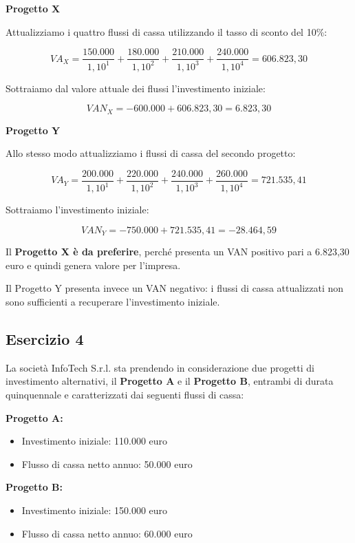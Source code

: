 \noindent\textbf{Progetto X}

\noindent Attualizziamo i quattro flussi di cassa utilizzando il tasso di sconto
del 10\%:

\[
VA_X=
\frac{150.000}{1,10^1}
+\frac{180.000}{1,10^2}
+\frac{210.000}{1,10^3}
+\frac{240.000}{1,10^4}
=606.823,30
\]

\noindent Sottraiamo dal valore attuale dei flussi l'investimento iniziale:

\[
VAN_X=-600.000+606.823,30
=\boxed{6.823,30}
\]

\noindent\textbf{Progetto Y}

\noindent Allo stesso modo attualizziamo i flussi di cassa del secondo progetto:

\[
VA_Y=
\frac{200.000}{1,10^1}
+\frac{220.000}{1,10^2}
+\frac{240.000}{1,10^3}
+\frac{260.000}{1,10^4}
=721.535,41
\]

\noindent Sottraiamo l'investimento iniziale:

\[
VAN_Y=-750.000+721.535,41
=\boxed{-28.464,59}
\]

\noindent Il \textbf{Progetto X è da preferire}, perché presenta un VAN positivo
pari a 6.823,30 euro e quindi genera valore per l'impresa.

\noindent Il Progetto Y presenta invece un VAN negativo: i flussi di cassa
attualizzati non sono sufficienti a recuperare l'investimento iniziale.
\newpage
\subsection{Esercizio 4}

\noindent La società InfoTech S.r.l. sta prendendo in considerazione due progetti
di investimento alternativi, il \textbf{Progetto A} e il \textbf{Progetto B},
entrambi di durata quinquennale e caratterizzati dai seguenti flussi di cassa:

\noindent\textbf{Progetto A:}
\begin{itemize}
    \item Investimento iniziale: 110.000 euro
    \item Flusso di cassa netto annuo: 50.000 euro
\end{itemize}

\noindent\textbf{Progetto B:}
\begin{itemize}
    \item Investimento iniziale: 150.000 euro
    \item Flusso di cassa netto annuo: 60.000 euro
\end{itemize}

